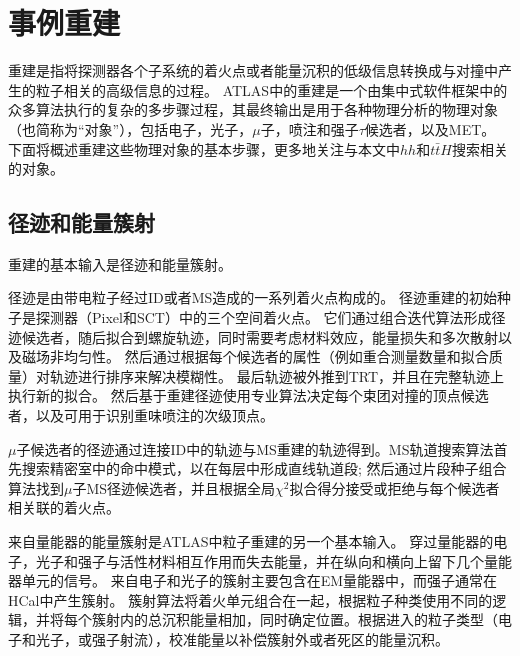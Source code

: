 \section{事例重建}\label{sec:evt_reco}
重建是指将探测器各个子系统的着火点或者能量沉积的低级信息转换成与对撞中产生的粒子相关的高级信息的过程。
ATLAS中的重建是一个由集中式软件框架中的众多算法执行的复杂的多步骤过程\cite{Calafiura:2005zz}，其最终输出是用于各种物理分析的物理对象（也简称为“对象”），包括电子，光子，$\mu$子，喷注和强子$\tau$候选者，以及MET。 下面将概述重建这些物理对象的基本步骤，更多地关注与本文中$hh$和$t\bar{t}H$搜索相关的对象。

\subsection{径迹和能量簇射}
重建的基本输入是径迹和能量簇射。

径迹是由带电粒子经过ID或者MS造成的一系列着火点构成的。
径迹重建\cite{Cornelissen:1020106}的初始种子是探测器（Pixel和SCT）中的三个空间着火点。
它们通过组合迭代算法形成径迹候选者，随后拟合到螺旋轨迹\cite{Cornelissen_2008}，同时需要考虑材料效应，能量损失和多次散射以及磁场非均匀性。
然后通过根据每个候选者的属性（例如重合测量数量和拟合质量）对轨迹进行排序来解决模糊性。 最后轨迹被外推到TRT，并且在完整轨迹上执行新的拟合。
然后基于重建径迹使用专业算法\cite{Piacquadio_2008}决定每个束团对撞的顶点候选者，以及可用于识别重味喷注的次级顶点。

$\mu$子候选者的径迹通过连接ID中的轨迹与MS重建的轨迹得到。MS轨道搜索算法\cite{Benekos_2008}首先搜索精密室中的命中模式，以在每层中形成直线轨道段;
然后通过片段种子组合算法找到$\mu$子MS径迹候选者，并且根据全局$\chi^{2}$拟合得分接受或拒绝与每个候选者相关联的着火点。

来自量能器的能量簇射是ATLAS中粒子重建的另一个基本输入。 
穿过量能器的电子，光子和强子与活性材料相互作用而失去能量，并在纵向和横向上留下几个量能器单元的信号。 来自电子和光子的簇射主要包含在EM量能器中，而强子通常在HCal中产生簇射。
簇射算法\cite{Lampl:1099735}将着火单元组合在一起，根据粒子种类使用不同的逻辑，并将每个簇射内的总沉积能量相加，同时确定位置。根据进入的粒子类型（电子和光子，或强子射流），校准能量以补偿簇射外或者死区的能量沉积。

